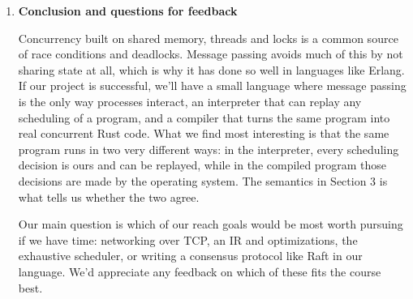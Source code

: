 \documentclass[11pt]{article}
\begin{document}
\begin{enumerate}
\medbreak
I commit to work and contribute equally to this project. \hfill --- Pramodya Rajapakse

\medbreak
I commit to work and contribute equally to this project. \hfill --- Qingze He

\medbreak
I commit to work and contribute equally to this project. \hfill --- Jim Brower

\bigbreak


\item
\textbf{Conclusion and questions for feedback}

Concurrency built on shared memory, threads and locks is a common source of race conditions and deadlocks. Message
passing avoids much of this by not sharing state at all, which is why it has done so well in languages like Erlang.
If our project is successful, we'll have a small language where message passing is the only way processes interact,
an interpreter that can replay any scheduling of a program, and a compiler that turns the same program into real
concurrent Rust code. What we find most interesting is that the same program runs in two very different ways: in
the interpreter, every scheduling decision is ours and can be replayed, while in the compiled program those
decisions are made by the operating system. The semantics in Section 3 is what tells us whether the two agree.

\medbreak
Our main question is which of our reach goals would be most worth pursuing if we have time: networking over TCP, an
IR and optimizations, the exhaustive scheduler, or writing a consensus protocol like Raft in our language. We'd
appreciate any feedback on which of these fits the course best.


\end{enumerate}



\end{document}
